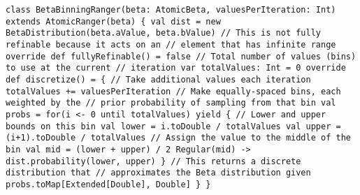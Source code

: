 \begin{flushleft}
\texttt{class BetaBinningRanger(beta: AtomicBeta, valuesPerIteration: Int) extends AtomicRanger(beta) \{
\newline\tab  val dist = new BetaDistribution(beta.aValue, beta.bValue)
\newline
\newline\tab  // This is not fully refinable because it acts on an 
\newline\tab  // element that has infinite range
\newline\tab  override def fullyRefinable() = false
\newline
\newline\tab  // Total number of values (bins) to use at the current
\newline\tab  // iteration
\newline\tab  var totalValues: Int = 0
\newline
\newline\tab  override def discretize() = \{
\newline\tab\tab    // Take additional values each iteration
\newline\tab\tab    totalValues += valuesPerIteration
\newline\tab\tab    // Make equally-spaced bins, each weighted by the
\newline\tab\tab    // prior probability of sampling from that bin
\newline\tab\tab    val probs = for(i <- 0 until totalValues) yield \{
\newline\tab\tab\tab      // Lower and upper bounds on this bin
\newline\tab\tab\tab      val lower = i.toDouble / totalValues
\newline\tab\tab\tab      val upper = (i+1).toDouble / totalValues
\newline\tab\tab\tab      // Assign the value to the middle of the bin
\newline\tab\tab\tab      val mid = (lower + upper) / 2
\newline\tab\tab\tab      Regular(mid) -> dist.probability(lower, upper)
\newline\tab\tab    \}
\newline\tab\tab    // This returns a discrete distribution that
\newline\tab\tab    // approximates the Beta distribution given
\newline\tab\tab    probs.toMap[Extended[Double], Double]
\newline\tab  \}
\newline\}
}
\end{flushleft}

